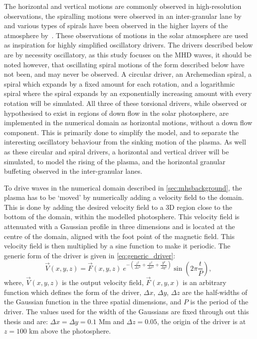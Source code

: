 The horizontal and vertical motions are commonly observed in high-resolution observations, the spiralling motions were observed in an inter-granular lane by~\cite{bonet2008, bonet2010} and various types of spirals have been observed in the higher layers of the atmosphere by~\cite{wedemeyer-bohm2009,wedemeyer-bohm2012,wedemeyer2013}.
These observations of motions in the solar atmosphere are used as inspiration for highly simplified oscillatory drivers.
The drivers described below are by necessity oscillatory, as this study focuses on the MHD waves, it should be noted however, that oscillating spiral motions of the form described below have not been, and may never be observed. 
A circular driver, an Archemedian spiral, a spiral which expands by a fixed amount for each rotation, and a logarithmic spiral where the spiral expands by an exponentially increasing amount with every rotation will be simulated.
All three of these torsional drivers, while observed or hypothesised to exist in regions of down flow in the solar photosphere, are implemented in the numerical domain as horizontal motions, without a down flow component.
This is primarily done to simplify the model, and to separate the interesting oscillatory behaviour from the sinking motion of the plasma.
As well as these circular and spiral drivers, a horizontal and vertical driver will be simulated, to model the rising of the plasma, and the horizontal granular buffeting observed in the inter-granular lanes.

To drive waves in the numerical domain described in \cref{sec:mhsbackground}, the plasma has to be `moved' by numerically adding a velocity field to the domain.
This is done by adding the desired velocity field to a 3D region close to the bottom of the domain, within the modelled photosphere.
This velocity field is attenuated with a Gaussian profile in three dimensions and is located at the centre of the domain, aligned with the foot point of the magnetic field.
This velocity field is then multiplied by a sine function to make it periodic. The generic form of the driver is given in \cref{eq:generic_driver}:
\begin{equation}
    \vec{V}(x,y,z) = \vec{F}(x,y,z) \ e^{-\left(\frac{z^2}{\Delta z^2} + \frac{x^2}{\Delta x^2} + \frac{y^2}{\Delta y^2}\right)} \sin \left(2\pi \frac{t}{P}\right),
    \label{eq:generic_driver}
\end{equation}
where, $\vec{V}(x,y,z)$ is the output velocity field, $\vec{F}(x,y,x)$ is an arbitrary function which defines the form of the driver, $\Delta x$, $\Delta y$, $\Delta z$ are the half-widths of the Gaussian function in the three spatial dimensions, and $P$ is the period of the driver.
The values used for the width of the Gaussians are fixed through out this thesis and are: $\Delta x = \Delta y = 0.1$ Mm and $\Delta z = 0.05$, the origin of the driver is at $z = 100$ km above the photosphere.

